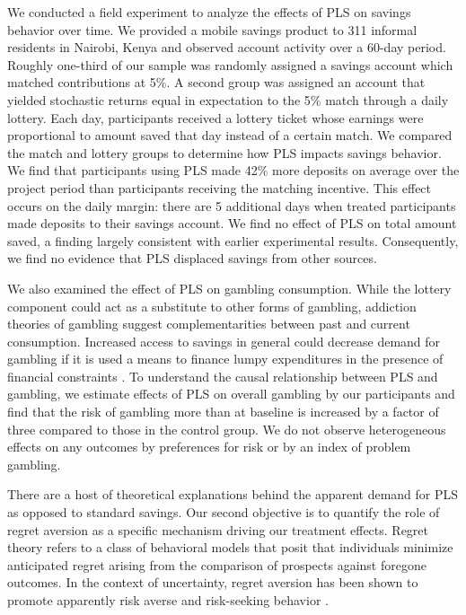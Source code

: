 \documentclass[12pt, titlepage]{article}
\begin{document}
	We conducted a field experiment to analyze the effects of PLS on savings behavior over time. We provided a mobile savings product to 311 informal residents in Nairobi, Kenya and observed account activity over a 60-day period. Roughly one-third of our sample was randomly assigned a savings account which matched contributions at 5\%. A second group was assigned an account that yielded stochastic returns equal in expectation to the 5\% match through a daily lottery. Each day, participants received a lottery ticket whose earnings were proportional to amount saved that day instead of a certain match. We compared the match and lottery groups to determine how PLS impacts savings behavior. We find that participants using PLS made 42\% more deposits on average over the project period than participants receiving the matching incentive. This effect occurs on the daily margin: there are 5 additional days when treated participants made deposits to their savings account. We find no effect of PLS on total amount saved, a finding largely consistent with earlier experimental results. Consequently, we find no evidence that PLS displaced savings from other sources. 

	We also examined the effect of PLS on gambling consumption. While the lottery component could act as a substitute to other forms of gambling, addiction theories of gambling \parencite{becker_theory_1988} suggest complementarities between past and current consumption. Increased access to savings in general could decrease demand for gambling if it is used a means to finance lumpy expenditures in the presence of financial constraints \parencite{herskowitz_gambling_2016}. To understand the causal relationship between PLS and gambling, we estimate effects of PLS on overall gambling by our participants and find that the risk of gambling more than at baseline is increased by a factor of three compared to those in the control group. We do not observe heterogeneous effects on any outcomes by preferences for risk or by an index of problem gambling.

	There are a host of theoretical explanations behind the apparent demand for PLS as opposed to standard savings. Our second objective is to quantify the role of regret aversion \parencite{bell_risk_1983,loomes_regret_1982} as a specific mechanism driving our treatment effects. Regret theory refers to a class of behavioral models that posit that individuals minimize anticipated regret arising from the comparison of prospects against foregone outcomes. In the context of uncertainty, regret aversion has been shown to promote apparently risk averse and risk-seeking behavior  \parencite{zeelenberg_consequences_1996}. 
\end{document}
